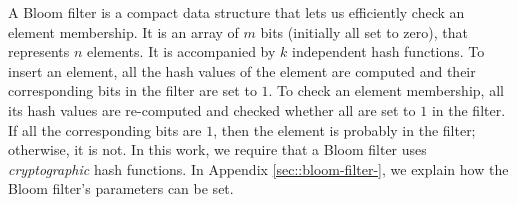 A Bloom filter \cite{DBLP:journals/cacm/Bloom70} is a compact data structure that lets us  
efficiently check an element membership. It is an array of $m$ bits (initially all set to zero), that represents $n$  elements. It is accompanied by $k$ independent hash functions. To insert an element, all the hash values of the element are computed and their corresponding bits in the filter are set to $1$. To check an element membership, all its hash values are re-computed and checked whether all are set to $1$ in the filter. If all the corresponding bits are $1$, then the element is probably in the filter; otherwise, it is not. In this work,  we require that a Bloom filter uses \emph{cryptographic} hash functions. In Appendix \ref{sec::bloom-filter-}, we explain how the Bloom filter's parameters can be set.








%

 

%

